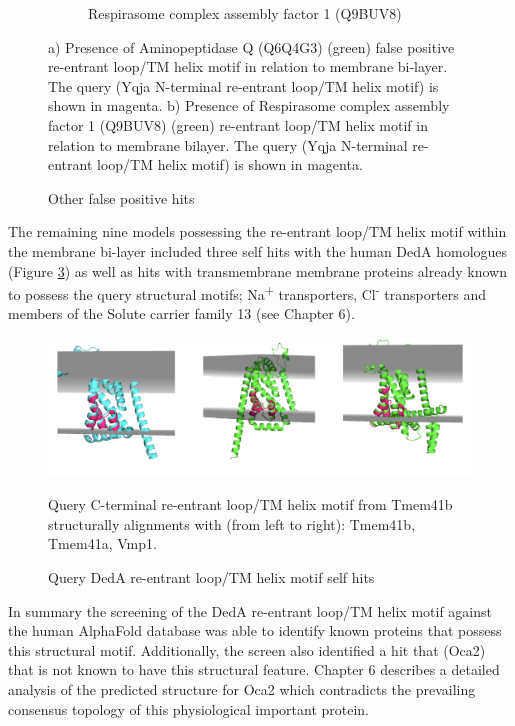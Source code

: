 \begin{figure}[htb]
\begin{subfigure}{0.3\textwidth}
  \caption{Respirasome 
complex assembly factor 1 (Q9BUV8) }
  \label{fig:q9b}
\end{subfigure}
\caption{Other false positive hits}
\small
\begin{flushleft}
a) Presence of Aminopeptidase Q (Q6Q4G3) (green) false positive re-entrant loop/TM helix motif in relation to membrane bi-layer. The query (Yqja N-terminal re-entrant loop/TM helix motif) is shown in magenta. b) Presence of Respirasome 
complex assembly factor 1 (Q9BUV8) (green) re-entrant loop/TM helix motif in relation to membrane bilayer. The query (Yqja N-terminal re-entrant loop/TM helix motif) is shown in magenta.
\end{flushleft}

\label{fig:other_false_hits}
\end{figure}

The remaining nine models possessing the re-entrant loop/TM helix motif within the membrane bi-layer included three self hits with the human DedA homologues (Figure \ref{fig:selfhits}) as well as hits with transmembrane membrane proteins already known to possess the query structural motifs; Na\textsuperscript{+} transporters, Cl\textsuperscript{-} transporters and members of the Solute carrier family 13 (see Chapter 6). 

\begin{figure}[th!]
    \centering
    \includegraphics[width=150mm, scale=0.75]{Pfam/self_hits.png}
    \caption{Query DedA re-entrant loop/TM helix motif self hits}
    \label{fig:selfhits}
    \small
   \begin{flushleft}
 Query C-terminal re-entrant loop/TM helix motif from Tmem41b structurally alignments with (from left to right): Tmem41b, Tmem41a, Vmp1.\end{flushleft}

\end{figure}

In summary the screening of the DedA re-entrant loop/TM helix motif against the human AlphaFold database was able to identify known proteins that possess this structural motif.  Additionally, the screen also identified a hit that (Oca2) that is not known to have this structural feature.  Chapter 6 describes a detailed analysis of the predicted structure for Oca2 which contradicts the prevailing consensus topology of this physiological important protein. 
\iffalse

